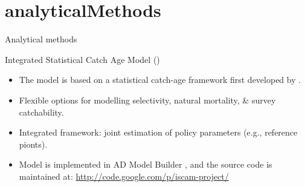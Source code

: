 \section{analyticalMethods} %
\label{sec:analyticalmethods}
%
\begin{frame} {Analytical methods} 
	
	\begin{block}
		{Integrated Statistical Catch Age Model (\iscam)}
		\begin{itemize}
			\item The model is based on a statistical catch-age framework first developed by \cite{fournier1982general}.
			
			\item Flexible options for modelling selectivity, natural mortality, \& survey catchability.
			
			\item Integrated framework: joint estimation of policy parameters (e.g., reference pionts).
			\item Model is implemented in AD Model Builder \cite{ADMB2009}, and the source code is maintained at:  \url{http://code.google.com/p/iscam-project/}
		\end{itemize}
	\end{block}
\end{frame}
%
